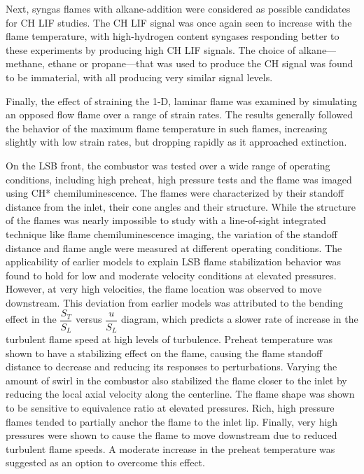 Next, syngas flames with alkane-addition were considered as possible candidates for CH LIF studies.
The CH LIF signal was once again seen to increase with the flame temperature, with high-hydrogen content syngases responding better to these experiments by producing high CH LIF signals.
The choice of alkane---methane, ethane or propane---that was used to produce the CH signal was found to be immaterial, with all producing very similar signal levels.

Finally, the effect of straining the 1-D, laminar flame was examined by simulating an opposed flow flame over a range of strain rates.
The results generally followed the behavior of the maximum flame temperature in such flames, increasing slightly with low strain rates, but dropping rapidly as it approached extinction.

On the LSB front, the combustor was tested over a wide range of operating conditions, including high preheat, high pressure tests and the flame was imaged using CH* chemiluminescence.
The flames were characterized by their standoff distance from the inlet, their cone angles and their structure.
While the structure of the flames was nearly impossible to study with a line-of-sight integrated technique like flame chemiluminescence imaging, the variation of the standoff distance and flame angle were measured at different operating conditions.
The applicability of earlier models to explain LSB flame stabilization behavior was found to hold for low and moderate velocity conditions at elevated pressures.
However, at very high velocities, the flame location was observed to move downstream.
This deviation from earlier models was attributed to the bending effect in the \(\dfrac{ S_T }{ S_L }\) versus \(\dfrac{ u }{ S_L}\) diagram, which predicts a slower rate of increase in the turbulent flame speed at high levels of turbulence.
Preheat temperature was shown to have a stabilizing effect on the flame, causing the flame standoff distance to decrease and reducing its responses to perturbations.
Varying the amount of swirl in the combustor also stabilized the flame closer to the inlet by reducing the local axial velocity along the centerline.
The flame shape was shown to be sensitive to equivalence ratio at elevated pressures.
Rich, high pressure flames tended to partially anchor the flame to the inlet lip.
Finally, very high pressures were shown to cause the flame to move downstream due to reduced turbulent flame speeds.
A moderate increase in the preheat temperature was suggested as an option to overcome this effect.


